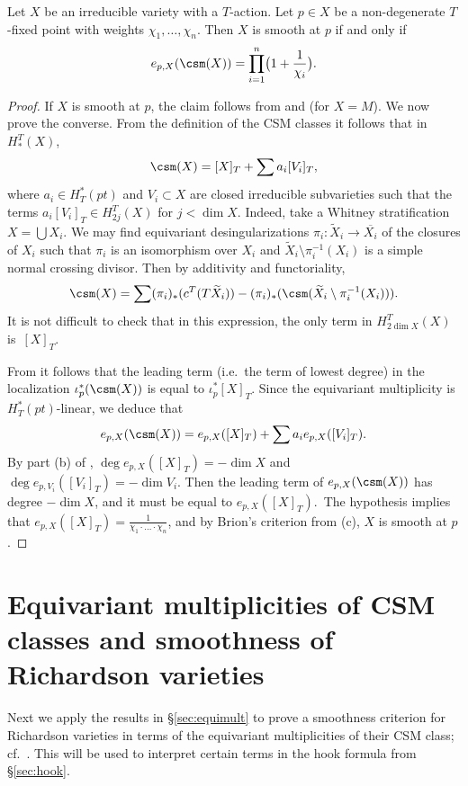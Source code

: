 \begin{theorem}\label{thm:csmsmooth} Let $X$ be an irreducible variety with a $T$-action. Let $p \in X$ be a non-degenerate $T$-fixed point with weights $\chi_1, \ldots, \chi_n$. Then $X$ is smooth at $p$ if and only
	if 
	\[ e_{p,X}(\csm(X)) = \prod_{i=1}^n  \bigl(1+ \frac{1}{\chi_i} \bigr) \/.\]
\end{theorem}
\begin{proof}If $X$ is smooth at $p$, the claim follows from  and  (for $X=M$). 
	We now prove the converse. From the definition of the CSM classes it follows that
	in $H_*^T(X)$,
	\begin{equation}\label{E:csmexp} \csm(X) = [X]_T + \sum a_i [V_i]_T \/, \end{equation}
	where $a_i \in H^*_T(pt)$ and $V_i \subset X$ are closed irreducible subvarieties such that the terms 
	$a_i [V_i]_T \in H_{2j}^T(X)$ for $j < \dim X$.
	Indeed, take a Whitney stratification $X = \bigcup X_i$. We may find equivariant desingularizations
	$\pi_i: \widetilde{X}_i \to \overline{X_i}$ of the closures of $X_i$ such that $\pi_i$ is an isomorphism
	over $X_i$ and $\widetilde{X}_i \setminus \pi_i^{-1}(X_i)$ is a simple normal crossing divisor. Then
	by additivity and functoriality, 
	\[ \csm(X) = \sum (\pi_i)_*(c^T ( T \widetilde{X}_i)) - (\pi_i)_*(\csm( \widetilde{X}_i \setminus \pi_i^{-1}(X_i))) \/. \]
	It is not difficult to check that in this expression, the only term in $H_{2 \dim X}^T(X)$ is~$[X]_T$.
	
	From  it follows that the leading term (i.e.~the term of lowest degree) in the localization $\iota_p^* (\csm(X))$ is equal to $\iota_p^*[X]_T$. Since the equivariant multiplicity is $H^*_T(pt)$-linear, we deduce that 
	\[ e_{p,X}(\csm(X)) = e_{p,X}([X]_T) + \sum a_i e_{p,X}([V_i]_T) \/. \] By part (b) of , $\deg e_{p,X}([X]_T) 
	= - \dim X$ and $\deg e_{p,V_i}([V_i]_T) = - \dim V_i $. Then the leading term of $e_{p,X}(\csm(X))$ has degree 
	$-\dim X$, and it must be equal to $e_{p,X}([X]_T)$.~The hypothesis implies that 
	$e_{p,X}([X]_T)= \frac{1}{\chi_1 \cdot \ldots \cdot \chi_n}$, and by Brion's criterion from (c), $X$ is smooth at $p$.
\end{proof}

\section{Equivariant multiplicities of CSM classes and smoothness of Richardson varieties}
Next we apply the results in \S\ref{sec:equimult} to prove a smoothness criterion for Richardson varieties in terms of the equivariant multiplicities of their CSM class; cf.~. This will be used to interpret certain terms in
the hook formula from \S\ref{sec:hook}.

